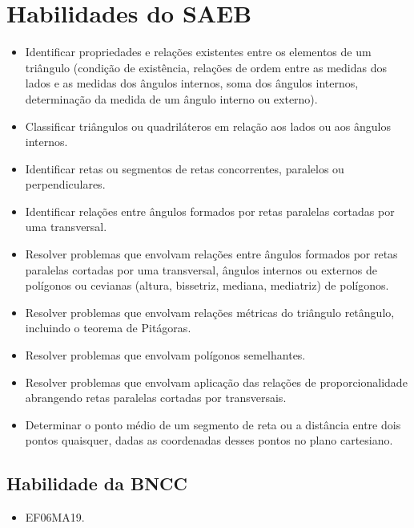 \section{Habilidades do SAEB} 
\begin{itemize}
\item Identificar propriedades e relações existentes
entre os elementos de um triângulo (condição de existência, relações de
ordem entre as medidas dos lados e as medidas dos ângulos internos, soma
dos ângulos internos, determinação da medida de um ângulo interno ou
externo).
\item
  Classificar triângulos ou quadriláteros em relação aos lados ou aos
  ângulos internos.
\item
  Identificar retas ou segmentos de retas concorrentes, paralelos ou
  perpendiculares.
\item
  Identificar relações entre ângulos formados por retas paralelas
  cortadas por uma transversal.
\item
  Resolver problemas que envolvam relações entre ângulos formados por
  retas paralelas cortadas por uma transversal, ângulos internos ou
  externos de polígonos ou cevianas (altura, bissetriz, mediana,
  mediatriz) de polígonos.
\item
  Resolver problemas que envolvam relações métricas do triângulo
  retângulo, incluindo o teorema de Pitágoras.
\item
  Resolver problemas que envolvam polígonos semelhantes.
\item
  Resolver problemas que envolvam aplicação das relações de
  proporcionalidade abrangendo retas paralelas cortadas por
  transversais.
\item
  Determinar o ponto médio de um segmento de reta ou a distância entre
  dois pontos quaisquer, dadas as coordenadas desses pontos no plano
  cartesiano.
\end{itemize}

\subsection{Habilidade da BNCC} 

\begin{itemize}
\item EF06MA19.
\end{itemize}

